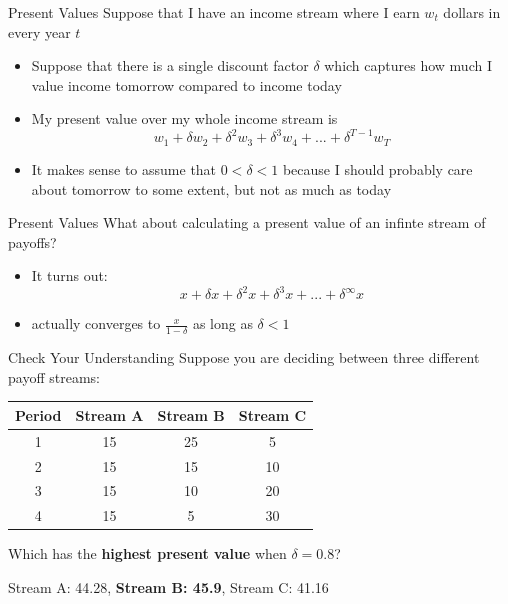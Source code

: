 \begin{frame}{Present Values}
  Suppose that I have an income stream where I earn $w_t$ dollars in every year $t$
  \begin{itemize}
    \item Suppose that there is a single \alert{discount factor} $\delta$ which captures how much I value income tomorrow compared to income today
    \item My present value over my whole income stream is 
    $$ w_1 + \delta w_2 + \delta^2 w_3 + \delta^3 w_4 + ... + \delta^{T-1} w_T $$
    \item It makes sense to assume that $0<\delta<1$ because I should probably care about tomorrow to some extent, but not as much as today
  \end{itemize}
\end{frame}

\begin{frame}{Present Values}
  What about calculating a present value of an \alert{infinte stream} of payoffs?
  \begin{itemize}
    \item It turns out:  
    $$ x + \delta x + \delta^2 x + \delta^3 x + ... + \delta^{\infty} x $$
    \item actually converges to $\frac{x}{1-\delta}$ as long as $\delta<1$ 
  \end{itemize}
\end{frame}

\begin{frame}{Check Your Understanding}
  Suppose you are deciding between three different payoff streams:
  \vspace{5mm}

  \begin{center}
  \begin{tabular}{|c|c|c|c|}
    \textbf{Period} & \textbf{Stream A} & \textbf{Stream B} & \textbf{Stream C} \\ \hline 
    1 & 15 & 25 &  5 \\ 
    2 & 15 & 15 & 10 \\ 
    3 & 15 & 10 & 20 \\ 
    4 & 15 &  5 & 30 \\
  \end{tabular}
  \end{center}

  \vspace{5mm}
  Which has the \textbf{highest present value} when $\delta =0.8$?
  \pause
  
  Stream A: 44.28, \textbf{Stream B: 45.9}, Stream C: 41.16
\end{frame}

